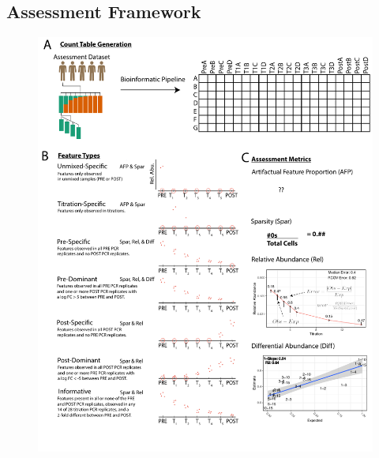 \documentclass{bmcart}
\begin{document}
\subsection*{Assessment Framework}
\begin{figure}
\centering
\includegraphics{AssessmentFramework.pdf}

\end{figure}
\end{document}
